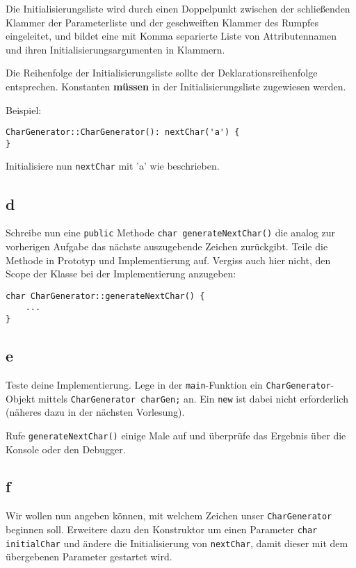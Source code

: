 Die Initialisierungsliste wird durch einen Doppelpunkt zwischen der schließenden Klammer der Parameterliste und der geschweiften Klammer des Rumpfes eingeleitet, und bildet eine mit Komma separierte Liste von Attributennamen und ihren Initialisierungsargumenten in Klammern.

Die Reihenfolge der Initialisierungsliste sollte der Deklarationsreihenfolge entsprechen.
Konstanten \textbf{müssen} in der Initialisierungsliste zugewiesen werden.

Beispiel:

\begin{lstlisting}
CharGenerator::CharGenerator(): nextChar('a') {
}
\end{lstlisting}

Initialisiere nun \texttt{nextChar} mit 'a' wie beschrieben.

\subsection{d}
Schreibe nun eine \texttt{public} Methode \texttt{char generateNextChar()} die analog zur vorherigen Aufgabe das nächste auszugebende Zeichen zurückgibt.
Teile die Methode in Prototyp und Implementierung auf.
Vergiss auch hier nicht, den Scope der Klasse bei der Implementierung anzugeben:

\begin{lstlisting}
char CharGenerator::generateNextChar() {
	...
}
\end{lstlisting}

\subsection{e}
Teste deine Implementierung.
Lege in der \texttt{main}-Funktion ein \texttt{CharGenerator}-Objekt mittels \texttt{CharGenerator charGen;} an.
Ein \texttt{new} ist dabei nicht erforderlich (näheres dazu in der nächsten Vorlesung).

Rufe \texttt{generateNextChar()} einige Male auf und überprüfe das Ergebnis über die Konsole oder den Debugger.

\subsection{f}
Wir wollen nun angeben können, mit welchem Zeichen unser \texttt{CharGenerator} beginnen soll.
Erweitere dazu den Konstruktor um einen Parameter \texttt{char initialChar} und ändere die Initialisierung von \texttt{nextChar}, damit dieser mit dem übergebenen Parameter gestartet wird.

